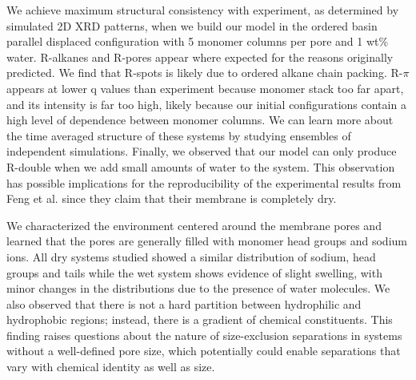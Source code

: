 \documentclass[journal=jpcbfk,manuscript=article]{achemso}
\begin{document}
  We achieve maximum structural consistency with experiment, as determined by
  simulated 2D XRD patterns, when we build our model in the ordered basin
  parallel displaced configuration with 5 monomer columns per pore and 1 wt\%
  water. R-alkanes and R-pores appear where expected for the reasons originally
  predicted. We find that R-spots is likely due to ordered alkane chain packing.
  R-$\pi$ appears at lower q values than experiment because monomer stack too far
  apart, and its intensity is far too high, likely because our initial
  configurations contain a high level of dependence between monomer columns.
  We can learn more about the time averaged structure of these systems by studying
  ensembles of independent simulations. Finally, we observed that our model can 
  only produce R-double when we add small amounts of water to the system. This 
  observation has possible implications for the reproducibility of the experimental
  results from Feng et al. since they claim that their membrane is completely dry. 

  

  We characterized the environment centered around the membrane pores and
  learned that the pores are generally filled with monomer head groups and sodium
  ions. All dry systems studied showed a similar distribution of sodium, head
  groups and tails while the wet system shows evidence of slight swelling, with
  minor changes in the distributions due to the presence of water molecules. We
  also observed that there is not a hard partition between hydrophilic and
  hydrophobic regions; instead, there is a gradient of chemical constituents. This finding raises
  questions about the nature of size-exclusion separations in systems without a
  well-defined pore size, which potentially could enable separations that
  vary with chemical identity as well as size. 
\end{document}
